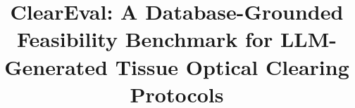 \documentclass[conference]{IEEEtran}
\begin{document}
\title{ClearEval: A Database-Grounded Feasibility Benchmark for LLM-Generated Tissue Optical Clearing Protocols}

\author{
}


\maketitle
\end{document}
